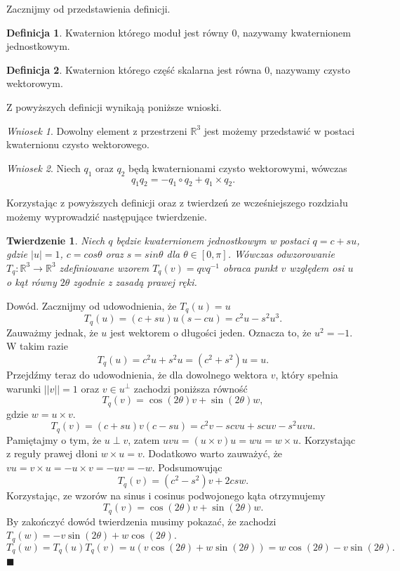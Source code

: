 \documentclass[a4paper,twoside,11pt,reqno]{mwrep}
\theoremstyle{plain} \newtheorem{twr}{Twierdzenie}
\theoremstyle{plain} \newtheorem{lem}{Lemat}
\theoremstyle{definition} \newtheorem{defi}{Definicja}
\theoremstyle{remark} \newtheorem*{wni}{Wniosek}
\theoremstyle{definition} \newtheorem{uwaga}{Uwaga}
\theoremstyle{definition}\newtheorem{prz}{Przykład}
\newenvironment{dowod}{\par\vspace{0.1cm}\par{\sc Dowód.}}{\hfill $\blacksquare$\par\vspace{0.4cm}\par}
\begin{document}
Zacznijmy od przedstawienia definicji.
\begin{defi}
Kwaternion którego moduł jest równy $0$, nazywamy kwaternionem jednostkowym.
\end{defi}
\begin{defi}
Kwaternion którego część skalarna jest równa $0$, nazywamy czysto wektorowym.
\end{defi}
Z powyższych definicji wynikają poniższe wnioski.
\begin{wni}
Dowolny element z przestrzeni $\mathbb{R}^3$ jest możemy przedstawić w
postaci kwaternionu czysto wektorowego.
\end{wni}
\begin{wni}
Niech $q_1$ oraz $q_2$ będą kwaternionami czysto wektorowymi, wówczas
$$q_1q_2 =-q_1\circ q_2 +q_1\times q_2 .$$ 
\end{wni}
Korzystając z powyższych definicji oraz z twierdzeń ze wcześniejszego rozdziału możemy wyprowadzić następujące twierdzenie.
\begin{twr}
Niech $q$ będzie kwaternionem jednostkowym w postaci $q=c+su$, gdzie $|u| = 1$, $c=cos\theta$
oraz $s=sin\theta$ dla $\theta\in[0,\pi]$. Wówczas odwzorowanie 
$T_q : \mathbb{R}^3\rightarrow \mathbb{R}^3$ zdefiniowane wzorem $T_q(v) = qvq^{-1}$ 
obraca punkt $v$ względem osi $u$ 
o kąt równy  $2\theta$ zgodnie z zasadą prawej ręki.
\end{twr}
\begin{dowod}
Zacznijmy od udowodnienia, że $T_q(u) = u$
$$T_q(u) = (c+su)u(s-cu) = c^2u - s^2 u^3.$$
Zauważmy jednak, że $u$ jest wektorem o długości jeden. Oznacza to, że
$u^2 = -1$. W takim razie
$$T_q(u) =  c^2u + s^2 u = (c^2+s^2)u=u.$$ 
Przejdźmy teraz do udowodnienia, że dla dowolnego wektora $v$, który spełnia warunki
$|| v || = 1$ oraz $v\in u^\perp$ zachodzi poniższa równość
$$T_q(v) = \cos\left(2\theta\right)v + \sin\left(2\theta\right)w,$$
gdzie $w = u\times v$.
$$T_q(v) = (c+su)v(c-su)=c^2v - scvu + scuv - s^2uvu.$$
Pamiętajmy o tym, że $u \perp v $, zatem $uvu =(u\times v)u = wu = w\times u$.
Korzystając z reguły prawej dłoni $w\times u = v$. Dodatkowo warto zauważyć, że
$vu= v\times u = -u\times v = -uv = -w$.
Podsumowując 
  $$T_q(v) = (c^2 - s^2)v +2csw.$$
Korzystając, ze wzorów na sinus i cosinus podwojonego kąta otrzymujemy 
$$T_q(v) = \cos\left(2\theta\right)v + \sin\left(2\theta\right)w.$$
By zakończyć dowód twierdzenia musimy pokazać, że zachodzi 
$T_q(w) = -v\sin\left(2\theta\right) + w\cos\left(2\theta\right).$
$$T_q(w) = T_q(u)T_q(v) = u(v\cos\left(2\theta\right) + w\sin\left(2\theta\right))=
w\cos\left(2\theta\right) - v\sin\left(2\theta\right) .$$
\end{dowod} 
\end{document}
